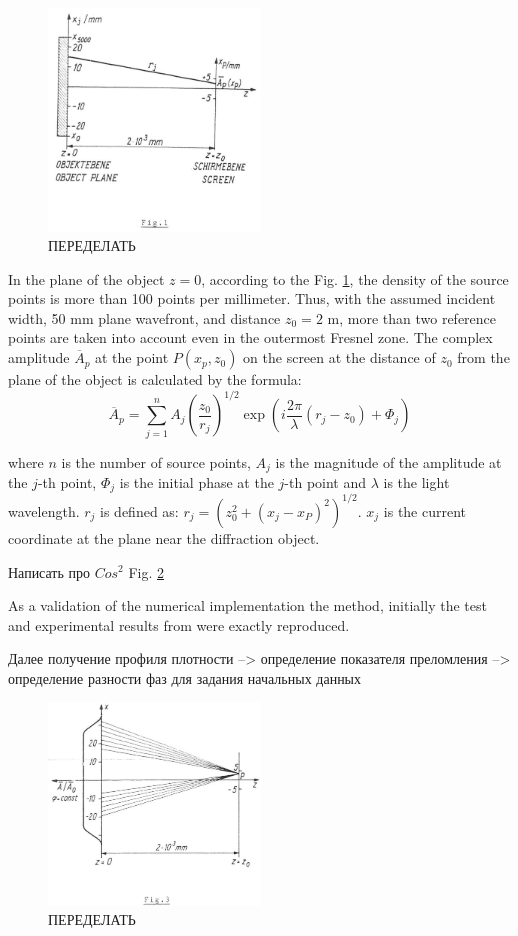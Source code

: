 \documentclass{aip-cp}
\begin{document}
\begin{figure}
    \centerline{\includegraphics[width=160pt]{figures/fig1.png}}
\caption{ПЕРЕДЕЛАТЬ}
\label{fig1}
\end{figure}

In the plane of the object $z=0$, according to the Fig. \ref{fig1}, the density of the source points is more than 100 points per millimeter. Thus, with the assumed incident width, 50 mm plane wavefront, and distance $z_0 = 2$ m, more than two reference points are taken into account even in the outermost Fresnel zone. The complex amplitude $\overline{A}_p$ at the point $P{(x_p, z_0)}$ on the screen at the distance of $z_0$ from the plane of the object is calculated by the formula:
\begin{equation}
\overline{A}_p = \sum_{j=1}^{n} A_j \left(\frac{z_0}{r_j} \right)^{1/2} \exp \left(i \frac{2\pi}{\lambda} \left(r_j - z_0\right) + \Phi_j\right)
\end{equation}

where $n$ is the number of source points, $A_j$ is the magnitude of the amplitude at the $j$-th point, $\Phi_j$ is the initial phase at the $j$-th point and $\lambda$ is the light wavelength. $r_j$ is  defined as: $r_j = \left(z_0^2 + \left(x_j - x_P\right)^2\right)^{1/2}$. $x_j$ is the current coordinate at the plane near the diffraction object.

Написать про $Cos^2$ Fig. \ref{fig3}

As a validation of the numerical implementation the method, initially the test and experimental results from \cite{Pfeifer} were exactly reproduced.


Далее получение профиля плотности --> определение показателя преломления --> определение разности фаз для задания начальных данных

\begin{figure}
    \centerline{\includegraphics[width=160pt]{figures/fig3.png}}
\caption{ПЕРЕДЕЛАТЬ}
\label{fig3}
\end{figure}
\end{document}
